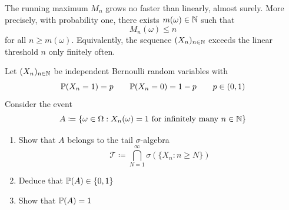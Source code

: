 \begin{solution}
\begin{enumerate}[label={\protect\hyperref[exitem:borel-cantelli-maxima:\arabic*]{(\alph*)}}]
\item \label{solitem:borel-cantelli-maxima:4}
The running maximum \(M_n\) grows no faster than linearly, almost surely.
More precisely, with probability one, there exists \(m(\omega) \in \mathbb{N}\) such that
\[
M_n(\omega) \le n
\]
for all \(n \ge m(\omega)\).
Equivalently, the sequence \((X_n)_{n \in \mathbb{N}}\) exceeds the linear threshold \(n\) only finitely often.
\qedhere
\end{enumerate}
\end{solution}

\begin{exercise} %
Let $(X_n)_{n \in \mathbb{N}}$ be independent Bernoulli random variables with
\[
\mathbb{P}(X_n = 1) = p
\qquad
\mathbb{P}(X_n = 0) = 1-p
\qquad
p \in (0,1)
\]
Consider the event
\[
A \coloneq \{\omega \in \Omega : \text{$X_n(\omega) = 1$ for infinitely many $n \in \mathbb{N}$}\}
\]
\begin{enumerate}[label=(\alph*)]
\item 
Show that $A$ belongs to the tail $\sigma$-algebra 
\[
\mathcal{T} \coloneq \bigcap_{N=1}^{\infty} \sigma(\{X_n : n \ge N\})
\]
\item 
Deduce that $\mathbb{P}(A) \in \{0,1\}$
\item 
Show that $\mathbb{P}(A) = 1$ 
\qedhere
\end{enumerate}
\end{exercise}

